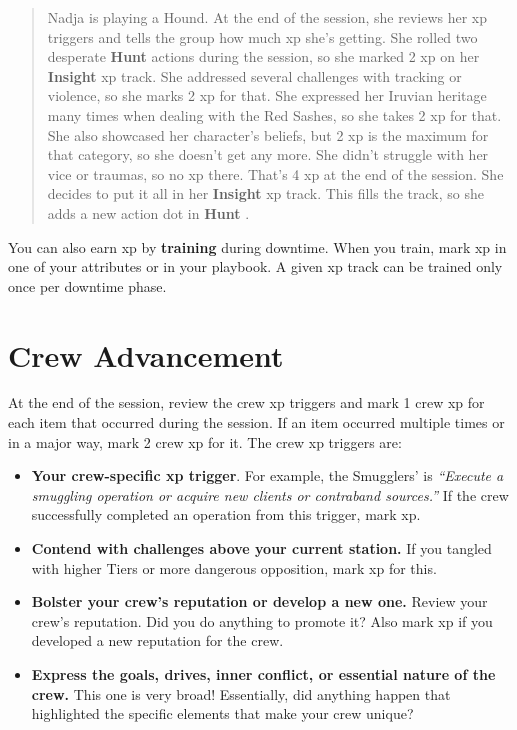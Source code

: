 \documentclass[11pt,fleqn,a5paper]{book}
\newcommand{\gameterm}[1]{\textbf{#1}}
\begin{document}
\begin{quote}
	Nadja is playing a Hound. At the end of the session, she reviews her xp triggers and tells the group how much xp she’s getting. She rolled two desperate \gameterm{Hunt}  actions during the session, so she marked 2 xp on her \gameterm{Insight}  xp track. She addressed several challenges with tracking or violence, so she marks 2 xp for that. She expressed her Iruvian heritage many times when dealing with the Red Sashes, so she takes 2 xp for that. She also showcased her character’s beliefs, but 2 xp is the maximum for that category, so she doesn’t get any more. She didn’t struggle with her vice or traumas, so no xp there. That’s 4 xp at the end of the session. She decides to put it all in her \gameterm{Insight}  xp track. This fills the track, so she adds a new action dot in \gameterm{Hunt} .
\end{quote}

You can also earn xp by \textbf{training} during downtime. When you train, mark xp in one of your attributes or in your playbook. A given xp track can be trained only once per downtime phase.

\section{Crew Advancement}

At the end of the session, review the crew xp triggers and mark 1 crew xp for each item that occurred during the session. If an item occurred multiple times or in a major way, mark 2 crew xp for it. The crew xp triggers are:

\begin{itemize}
	\item \textbf{Your crew-specific xp trigger}. For example, the Smugglers’ is \emph{“Execute a smuggling operation or acquire new clients or contraband sources.”} If the crew successfully completed an operation from this trigger, mark xp.
	\item \textbf{Contend with challenges above your current station.} If you tangled with higher Tiers or more dangerous opposition, mark xp for this.
	\item \textbf{Bolster your crew’s reputation or develop a new one.} Review your crew’s reputation. Did you do anything to promote it? Also mark xp if you developed a new reputation for the crew.
	\item \textbf{Express the goals, drives, inner conflict, or essential nature of the crew.} This one is very broad! Essentially, did anything happen that highlighted the specific elements that make your crew unique?
\end{itemize}
\end{document}
